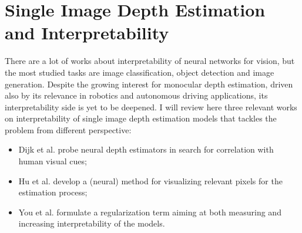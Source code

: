 \section{Single Image Depth Estimation and Interpretability}
\label{sec:SIDE and interpretability}
There are a lot of works about interpretability of neural networks for vision, but the most studied tasks are image classification, object detection and image generation.
Despite the growing interest for monocular depth estimation, driven also by its relevance in robotics and autonomous driving applications, its interpretability side is yet to be deepened.
I will review here three relevant works on interpretability of single image depth estimation models that tackles the problem from different perspective:
\begin{itemize}
    \item{Dijk et al. \cite{Dijk} probe neural depth estimators in search for correlation with human visual cues;}
    \item{Hu et al. \cite{Hu} develop a (neural) method for visualizing relevant pixels for the estimation process;}
    \item{You et al. \cite{towards_interpretable} formulate a regularization term aiming at both measuring and increasing interpretability of the models.}
\end{itemize}


